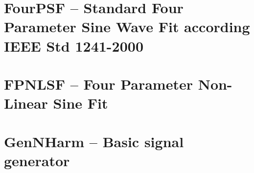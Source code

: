 \documentclass[12pt,a4paper,oneside]{report} %
\begin{document}
\chapter{FourPSF -- Standard Four Parameter Sine Wave Fit according IEEE Std 1241-2000} %
\stopcontents[maintoc]
\section*{\infosection} %

\section*{\examplesection} %

\resumecontents[maintoc]

\chapter{FPNLSF -- Four Parameter Non-Linear Sine Fit} %
\stopcontents[maintoc]
\section*{\infosection} %

\section*{\examplesection} %

\resumecontents[maintoc]

\chapter{GenNHarm -- Basic signal generator} %
\stopcontents[maintoc]
\section*{\infosection} %

\end{document}
